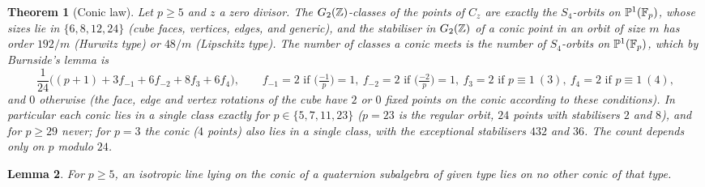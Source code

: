 \documentclass[11pt]{amsart}
\newtheorem{theorem}{Theorem}[section]
\newtheorem{lemma}[theorem]{Lemma}
\theoremstyle{definition}
\begin{document}
\begin{theorem}[Conic law]\label{thm:conic}
Let $p\ge 5$ and $z$ a zero divisor. The $G_2(\mathbb{Z})$-classes of the points of $C_z$ are exactly the $S_4$-orbits on $\mathbb P^1(\mathbb{F}_p)$, whose sizes lie in $\{6,8,12,24\}$ (cube faces, vertices, edges, and generic), and the stabiliser in $G_2(\mathbb{Z})$ of a conic point in an orbit of size $m$ has order $192/m$ (Hurwitz type) or $48/m$ (Lipschitz type). The number of classes a conic meets is the number of $S_4$-orbits on $\mathbb P^1(\mathbb{F}_p)$, which by Burnside's lemma is
\[\frac{1}{24}\Big((p+1)+3f_{-1}+6f_{-2}+8f_3+6f_4\Big),\qquad f_{-1}=2\text{ if }\big(\tfrac{-1}{p}\big)=1,\ f_{-2}=2\text{ if }\big(\tfrac{-2}{p}\big)=1,\ f_3=2\text{ if }p\equiv1\ (3),\ f_4=2\text{ if }p\equiv1\ (4),\]
and $0$ otherwise (the face, edge and vertex rotations of the cube have $2$ or $0$ fixed points on the conic according to these conditions). In particular each conic lies in a single class exactly for $p\in\{5,7,11,23\}$ ($p=23$ is the regular orbit, $24$ points with stabilisers $2$ and $8$), and for $p\ge 29$ never; for $p=3$ the conic ($4$ points) also lies in a single class, with the exceptional stabilisers $432$ and $36$. The count depends only on $p$ modulo $24$.
\end{theorem}
\begin{lemma}\label{lem:unique}
For $p\ge 5$, an isotropic line lying on the conic of a quaternion subalgebra of given type lies on no other conic of that type.
\end{lemma}
\end{document}
